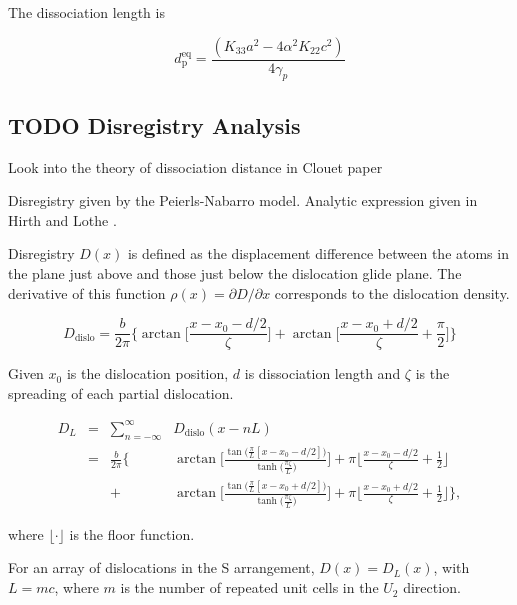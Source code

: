 \documentclass[11pt]{article}
\begin{document}
The dissociation length is 

\[
    d_{\text{p}}^{\text{eq}} = \frac{ ( K_{33}a^2 - 4 \alpha^2 K_{22} c^2 ) }{ 4 \gamma_{p} }
    \]


\subsection{{\bfseries\sffamily TODO} Disregistry Analysis}
\label{sec:org94b92fc}
Look into the theory of dissociation distance in Clouet paper
\cite{Clouet2012}


Disregistry given by the Peierls-Nabarro model. Analytic
expression given in Hirth and Lothe \cite{anderson2017theory}.

Disregistry \(D(x)\) is defined as the displacement difference
between the atoms in the plane just above and those just below the
dislocation glide plane. The derivative of this function \(\rho(x) = \partial
    D / \partial x\) corresponds to the dislocation density.


\[
    D_{\text{dislo}} = \frac{b}{2\pi} 
    \Bigg\{ \arctan \bigg[  \frac{x - x_0 - d/2}{ \zeta } \bigg] +
           \arctan \bigg[  \frac{x - x_0 + d/2}{ \zeta } + \frac{\pi}{2} \bigg]
	   \Bigg\}
    \]

Given \(x_0\) is the dislocation position, \(d\) is dissociation
length and \(\zeta\) is the spreading of each partial dislocation. 

\begin{align*}
  D_{L} &= &\sum_{n = -\infty}^{\infty}  &D_{\text{dislo}} (x - nL) \\
     &= &\frac{ b }{ 2\pi } 
        \Bigg \{ 
         &\arctan \bigg[ 
            \frac{ 
                  \tan \big( \frac{\pi}{L} [x - x_0 - d/2] \big)
                 }{ 
                 \tanh \big( \frac{\pi\zeta}{L} \big)
                  } \bigg]
       + \pi\bigg\lfloor 
       	 \frac{x - x_0 - d/2}{ \zeta } + \frac{1}{2}
       \bigg\rfloor \\
   & &+
         &\arctan \bigg[ 
            \frac{ 
                  \tan \big( \frac{\pi}{L} [x - x_0 + d/2] \big)
                 }{ 
                 \tanh \big( \frac{\pi\zeta}{L} \big)
                  } \bigg]
       + \pi \bigg\lfloor 
       	 \frac{x - x_0 + d/2}{ \zeta } + \frac{1}{2}
       \bigg\rfloor    \Bigg\},
\end{align*}

where \(\lfloor \cdot \rfloor\) is the floor function. 

For an array of dislocations in the S arrangement, \(D(x) = D_L(x)\),
with \(L = mc\), where \(m\) is the number of repeated unit cells in
the \(U_2\) direction. 
\end{document}
